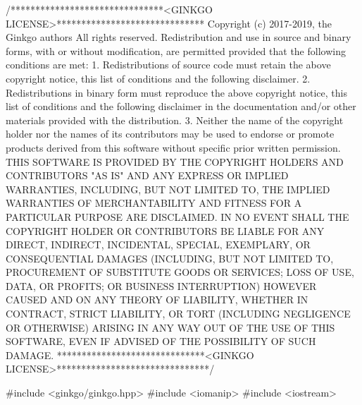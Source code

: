 \begin{DoxyCodeInclude}
\textcolor{comment}{/*******************************<GINKGO LICENSE>******************************}
\textcolor{comment}{Copyright (c) 2017-2019, the Ginkgo authors}
\textcolor{comment}{All rights reserved.}
\textcolor{comment}{}
\textcolor{comment}{Redistribution and use in source and binary forms, with or without}
\textcolor{comment}{modification, are permitted provided that the following conditions}
\textcolor{comment}{are met:}
\textcolor{comment}{}
\textcolor{comment}{1. Redistributions of source code must retain the above copyright}
\textcolor{comment}{notice, this list of conditions and the following disclaimer.}
\textcolor{comment}{}
\textcolor{comment}{2. Redistributions in binary form must reproduce the above copyright}
\textcolor{comment}{notice, this list of conditions and the following disclaimer in the}
\textcolor{comment}{documentation and/or other materials provided with the distribution.}
\textcolor{comment}{}
\textcolor{comment}{3. Neither the name of the copyright holder nor the names of its}
\textcolor{comment}{contributors may be used to endorse or promote products derived from}
\textcolor{comment}{this software without specific prior written permission.}
\textcolor{comment}{}
\textcolor{comment}{THIS SOFTWARE IS PROVIDED BY THE COPYRIGHT HOLDERS AND CONTRIBUTORS "AS}
\textcolor{comment}{IS" AND ANY EXPRESS OR IMPLIED WARRANTIES, INCLUDING, BUT NOT LIMITED}
\textcolor{comment}{TO, THE IMPLIED WARRANTIES OF MERCHANTABILITY AND FITNESS FOR A}
\textcolor{comment}{PARTICULAR PURPOSE ARE DISCLAIMED. IN NO EVENT SHALL THE COPYRIGHT}
\textcolor{comment}{HOLDER OR CONTRIBUTORS BE LIABLE FOR ANY DIRECT, INDIRECT, INCIDENTAL,}
\textcolor{comment}{SPECIAL, EXEMPLARY, OR CONSEQUENTIAL DAMAGES (INCLUDING, BUT NOT}
\textcolor{comment}{LIMITED TO, PROCUREMENT OF SUBSTITUTE GOODS OR SERVICES; LOSS OF USE,}
\textcolor{comment}{DATA, OR PROFITS; OR BUSINESS INTERRUPTION) HOWEVER CAUSED AND ON ANY}
\textcolor{comment}{THEORY OF LIABILITY, WHETHER IN CONTRACT, STRICT LIABILITY, OR TORT}
\textcolor{comment}{(INCLUDING NEGLIGENCE OR OTHERWISE) ARISING IN ANY WAY OUT OF THE USE}
\textcolor{comment}{OF THIS SOFTWARE, EVEN IF ADVISED OF THE POSSIBILITY OF SUCH DAMAGE.}
\textcolor{comment}{******************************<GINKGO LICENSE>*******************************/}

\textcolor{preprocessor}{#include <ginkgo/ginkgo.hpp>}
\textcolor{preprocessor}{#include <iomanip>}
\textcolor{preprocessor}{#include <iostream>}



\end{DoxyCodeInclude}
